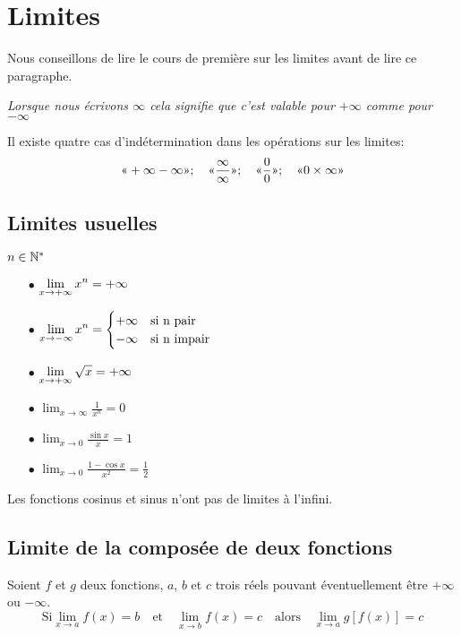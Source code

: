 




\section{Limites}
Nous conseillons de lire le cours de première sur les limites avant de lire ce paragraphe.

\textsl{Lorsque nous écrivons $ \infty $ cela signifie que c'est valable pour $ +\infty$ comme pour $-\infty $ }

 Il existe quatre cas d'indétermination dans les opérations sur les limites:
\[ \text{<<} +\infty -\infty \text{>>};\quad\text{<<} \frac{\infty}{\infty} \text{>>};\quad\text{<<} \frac{0}{0}\text{>>};\quad \text{<<} 0\times \infty \text{>>} \]
\subsection{Limites usuelles}
 $ n\in\mathbb{N}^* $
\begin{itemize}
\item[$ \bullet $] $\displaystyle \lim_{x \to +\infty}x^{n}= +\infty$ 
\item[$ \bullet $] $\displaystyle\lim_{x \to -\infty}x^{n}= \begin{cases}
+\infty & \text{si n pair} \\
-\infty & \text{si  n impair}
\end{cases}$ 
\item[$ \bullet $] $\displaystyle \lim_{x \to +\infty}\sqrt{x}=+\infty$ 
\item[$ \bullet $] $\displaystyle \lim_{x \to \infty} \frac{1}{x^{n}}=0$ 
\item[$ \bullet $] $\displaystyle \lim_{x \to 0}\frac{\sin x}{x}=1$ 
\item[$ \bullet $] $ \displaystyle\lim_{x \to 0}\frac{1-\cos x}{x^{2}}= \frac{1}{2}$ 

\end{itemize}
\begin{remark}
Les fonctions cosinus et sinus n'ont pas de limites à l'infini.
\end{remark}
\subsection{Limite de la composée de deux fonctions}
 Soient $f $  et $g$ deux fonctions, $a $, $b$  et  $c$ trois réels pouvant éventuellement être $ +\infty $ ou $ -\infty $. 
\[\text{Si} \lim_{x \to a} f(x) = b \quad \text{et} \quad  \lim_{x \to b} f(x) = c \quad \text{alors} \quad  \lim_{x \to a} g[f(x)] = c \]
  
